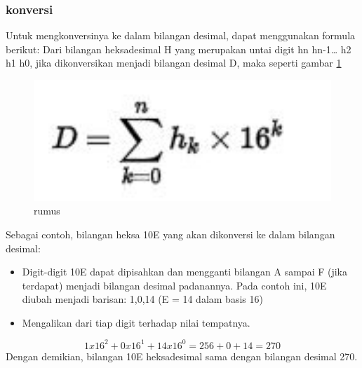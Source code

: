 \subsubsection{konversi}
Untuk mengkonversinya ke dalam bilangan desimal, dapat menggunakan formula berikut:
Dari bilangan heksadesimal H yang merupakan untai digit hn hn-1… h2 h1 h0, jika dikonversikan menjadi bilangan desimal D, maka seperti gambar \ref{rumus}
\begin{figure}[ht]
	\centerline{\includegraphics[width=1\textwidth]{figures/rumus.jpg}}
	\caption{rumus}
	\label{rumus}
	\end{figure}
Sebagai contoh, bilangan heksa 10E yang akan dikonversi ke dalam bilangan desimal:
\begin{itemize}
\item Digit-digit 10E dapat dipisahkan dan mengganti bilangan A sampai F (jika terdapat) menjadi bilangan desimal padanannya. Pada contoh ini, 10E diubah menjadi barisan: 1,0,14 (E = 14 dalam basis 16)
\item Mengalikan dari tiap digit terhadap nilai tempatnya.
\end{itemize}
\begin{equation}
1 x 16^2 + 0 x 16^1 + 14 x 16^0
= 256 + 0 + 14
= 270
\end{equation}
Dengan demikian, bilangan 10E heksadesimal sama dengan bilangan desimal 270.


